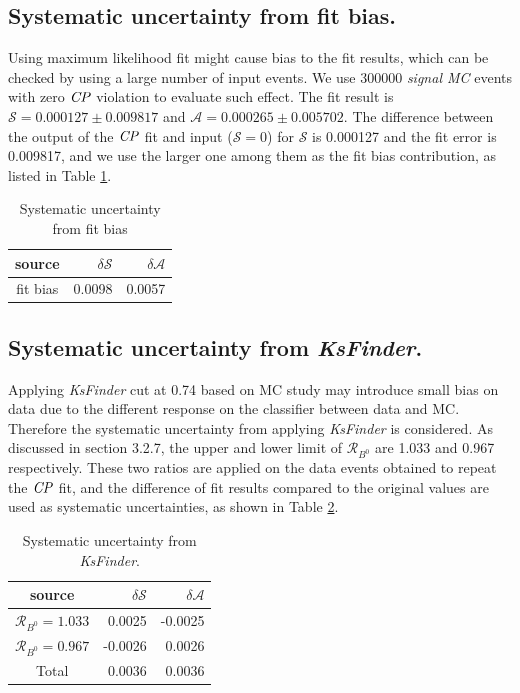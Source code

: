 \subsection{Systematic uncertainty from fit bias.}
Using maximum likelihood fit might cause bias to the fit results, which can be checked by using a large number of input events. We use 300000 \textit{signal MC}  events with zero $\it{CP}$ violation to evaluate such effect. The fit result is $\mathcal{S} = 0.000127\pm0.009817$ and $\mathcal{A} = 0.000265\pm0.005702$. The difference between the output of the $\it{CP}$ fit and input ($\mathcal{S}=0$) for $\mathcal{S}$ is 0.000127 and the fit error is 0.009817, and we use the larger one among them as the fit bias contribution, as listed in Table \ref{tab:fitbias}.

\begin{table}[htpb]
	\begin{minipage}[b]{1.0\linewidth}
		\centering
		\caption{Systematic uncertainty from fit bias}
		\label{tab:fitbias}
		\begin{tabular}{c r r}
			\hline
			source & $\delta \mathcal{S}$ & $\delta \mathcal{A}$ \\
			\hline
			fit bias & 0.0098 & 0.0057\\
			\hline
		\end{tabular}
	\end{minipage}
\end{table}


\subsection{Systematic uncertainty from \textit{KsFinder}.}
Applying \textit{KsFinder} cut at 0.74 based on MC study may introduce small bias on data due to the different response on the classifier between data and MC. Therefore the systematic uncertainty from applying \textit{KsFinder} is considered. As discussed in section 3.2.7, the upper and lower limit of  $\mathcal{R}_{B^0}$ are 1.033 and 0.967 respectively. These two ratios are applied on the data events obtained  to repeat the $\it{CP}$ fit, and the difference of fit results compared to the original values are used as systematic uncertainties, as shown in Table \ref{tab:sy_ks}.

\begin{table}[htpb]
	\begin{minipage}[b]{1.0\linewidth}
		\centering
		\caption{Systematic uncertainty from \textit{KsFinder}.}
		\label{tab:sy_ks}
		\begin{tabular}{c r r}
			\hline
			source & $\delta \mathcal{S}$ & $\delta \mathcal{A}$ \\
			\hline
			$\mathcal{R}_{B^0}=1.033$ & 0.0025
 & -0.0025\\
			$\mathcal{R}_{B^0}=0.967$ & -0.0026
& 0.0026
\\
			\hline
			Total &
			{$0.0036$} &
			{$0.0036$}\\
			\hline
		\end{tabular}
	\end{minipage}
\end{table}

